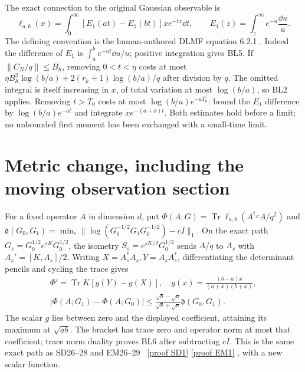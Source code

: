 \documentclass[11pt]{article}
\newcommand{\Tr}{\operatorname{Tr}}\newcommand{\diag}{\operatorname{diag}}
\begin{document}
The exact connection to the original Gaussian observable is
\begin{equation}\tag{BL5}
 \ell_{a,b}(x)=\int_0^\infty[E_1(at)-E_1(bt)]xe^{-tx}\dd t,
 \qquad E_1(z)=\int_z^\infty e^{-u}\frac{\dd u}{u}.
\end{equation}
The defining convention is the human-authored DLMF equation 6.2.1
\cite{E1}. Indeed the difference of $E_1$ is
$\int_a^b e^{-ut}\dd u/u$; positive integration gives BL5.
If $\|C_N/q\|\le B_h$, removing $0<t<\eta$ costs at most
$\eta B_h^2\log(b/a)+2(r_k+1)\log(b/a)/q$ after division by $q$.
The omitted integral is itself increasing in $x$, of total variation
at most $\log(b/a)$, so BL2 applies. Removing $t>T_0$ costs at most
$\log(b/a)e^{-aT_0}$: bound the $E_1$ difference by
$\log(b/a)e^{-at}$ and integrate $xe^{-(a+x)t}$.
Both estimates hold before a limit; no unbounded first moment has
been exchanged with a small-time limit.

\section{Metric change, including the moving observation section}
For a fixed operator $A$ in dimension $d$, put
$\Phi(A;G)=\Tr\ell_{a,b}(A^{\dagger_G}A/q^2)$ and
$\mathfrak d(G_0,G_1)=\min_c\|\log(G_0^{-1/2}G_1G_0^{-1/2})-cI\|_1$.
On the exact path $G_s=G_0^{1/2}e^{sK}G_0^{1/2}$, the isometry
$S_s=e^{sK/2}G_0^{1/2}$ sends $A/q$ to $A_s$ with
$A_s'=[K,A_s]/2$. Writing $X=A_s^*A_s,Y=A_sA_s^*$, differentiating
the determinant pencils and cycling the trace gives
\begin{equation}\tag{BL6}\begin{gathered}
 \Phi'=\Tr K[g(Y)-g(X)],\quad
 g(x)=\frac{(b-a)x}{(a+x)(b+x)},\\
 \boxed{|\Phi(A;G_1)-\Phi(A;G_0)|\le
 \frac{\sqrt b-\sqrt a}{\sqrt b+\sqrt a}\mathfrak d(G_0,G_1).}
\end{gathered}\end{equation}
The scalar $g$ lies between zero and the displayed coefficient,
attaining its maximum at $\sqrt{ab}$. The bracket has trace zero
and operator norm at most that coefficient; trace norm duality proves
BL6 after subtracting $cI$. This is the same exact path as SD26--28
and EM26--29 \cite{SD,EM}%
~\href{https://github.com/KokunoYumeto/zeta-function-research-reader/blob/5992ad50c0f2a06921f1fcaded7b4e38097c0739/workbenches/splitzero-tandem/continuations/20260920-original-kernel-mixed-determinants/providers/ORIGINAL_SPECTRAL_DETERMINANT.tex\#L34}{[proof SD1]} \href{https://github.com/KokunoYumeto/zeta-function-research-reader/blob/5992ad50c0f2a06921f1fcaded7b4e38097c0739/workbenches/splitzero-tandem/continuations/20260920-original-kernel-mixed-determinants/providers/ENDPOINT_METRIC_HEAT.tex\#L38}{[proof EM1]}%
{}, with a new scalar function.
\end{document}
